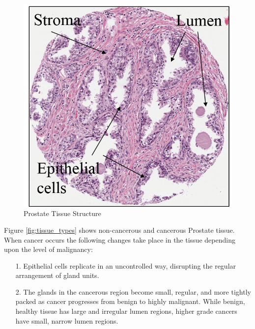 \begin{figure}[!htb]
\centering
\includegraphics[scale=0.3]{figs/tissue_structure1.png}
\caption{Prostate Tissue Structure}\label{fig:tissue_structure1}
\centering
\end{figure}


Figure \ref{fig:tissue_types} shows non-cancerous and cancerous Prostate tissue. When cancer occurs the following changes take place in the tissue depending upon the level of malignancy:
\begin{enumerate}
\item[1.] Epithelial cells replicate in an uncontrolled way, disrupting the regular arrangement of gland units.
\item[2.] The glands in the cancerous region become small, regular, and more tightly packed as
cancer progresses from benign to highly malignant. While benign, healthy tissue has large and irregular lumen regions, higher grade cancers have small, narrow lumen regions.
\end{enumerate}




